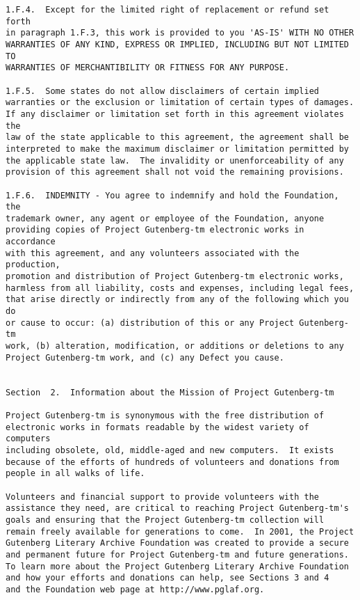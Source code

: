 \documentclass[12pt,oneside]{book}
\begin{document}
\begin{verbatim}
1.F.4.  Except for the limited right of replacement or refund set forth
in paragraph 1.F.3, this work is provided to you 'AS-IS' WITH NO OTHER
WARRANTIES OF ANY KIND, EXPRESS OR IMPLIED, INCLUDING BUT NOT LIMITED TO
WARRANTIES OF MERCHANTIBILITY OR FITNESS FOR ANY PURPOSE.

1.F.5.  Some states do not allow disclaimers of certain implied
warranties or the exclusion or limitation of certain types of damages.
If any disclaimer or limitation set forth in this agreement violates the
law of the state applicable to this agreement, the agreement shall be
interpreted to make the maximum disclaimer or limitation permitted by
the applicable state law.  The invalidity or unenforceability of any
provision of this agreement shall not void the remaining provisions.

1.F.6.  INDEMNITY - You agree to indemnify and hold the Foundation, the
trademark owner, any agent or employee of the Foundation, anyone
providing copies of Project Gutenberg-tm electronic works in accordance
with this agreement, and any volunteers associated with the production,
promotion and distribution of Project Gutenberg-tm electronic works,
harmless from all liability, costs and expenses, including legal fees,
that arise directly or indirectly from any of the following which you do
or cause to occur: (a) distribution of this or any Project Gutenberg-tm
work, (b) alteration, modification, or additions or deletions to any
Project Gutenberg-tm work, and (c) any Defect you cause.


Section  2.  Information about the Mission of Project Gutenberg-tm

Project Gutenberg-tm is synonymous with the free distribution of
electronic works in formats readable by the widest variety of computers
including obsolete, old, middle-aged and new computers.  It exists
because of the efforts of hundreds of volunteers and donations from
people in all walks of life.

Volunteers and financial support to provide volunteers with the
assistance they need, are critical to reaching Project Gutenberg-tm's
goals and ensuring that the Project Gutenberg-tm collection will
remain freely available for generations to come.  In 2001, the Project
Gutenberg Literary Archive Foundation was created to provide a secure
and permanent future for Project Gutenberg-tm and future generations.
To learn more about the Project Gutenberg Literary Archive Foundation
and how your efforts and donations can help, see Sections 3 and 4
and the Foundation web page at http://www.pglaf.org.



\end{verbatim}
\end{document}
